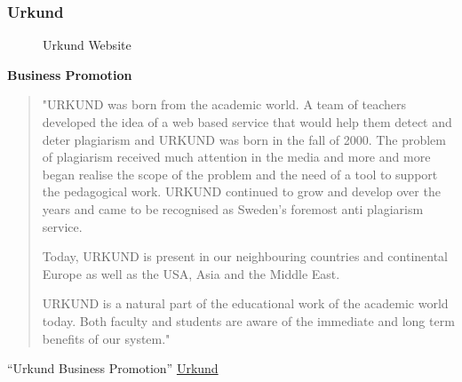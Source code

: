 \newpage
\subsubsection{Urkund}

 \begin{figure}[!h]
  \centering
  \caption{Urkund Website}
  \label{fig:Urkund Website}
\end{figure}

\textbf{Business Promotion}
\begin{quote}
"URKUND was born from the academic world. A team of teachers developed the idea of a web based service that would help them detect and deter plagiarism and URKUND was born in the fall of 2000. The problem of plagiarism received much attention in the media and more and more began realise the scope of the problem and the need of a tool to support the pedagogical work. URKUND continued to grow and develop over the years and came to be recognised as Sweden's foremost anti plagiarism service.

Today, URKUND is present in our neighbouring countries and continental Europe as well as the USA, Asia and the Middle East.

URKUND is a natural part of the educational work of the academic world today. Both faculty and students are aware of the immediate and long term benefits of our system."
\end{quote}\enquote{Urkund Business Promotion}\citep{Urkund Website} \href{http://www.urkund.com}{Urkund}


